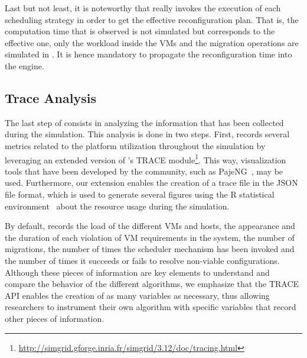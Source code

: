 Last but not least, it is noteworthy that \vmps really invokes the
execution of each scheduling strategy in order to get the effective
reconfiguration plan.  That is, the computation time that is observed
is not simulated but corresponds to the effective one, only the
workload inside the VMs and the migration operations are simulated in
\sg. It is hence mandatory to propagate the reconfiguration time into
the \sg engine.%

\subsection{Trace Analysis}
\label{subsec:traces-analysis}

The last step of \vmps consists in analyzing the information that has
been collected during the simulation.
This analysis is done in two steps. First, \vmps records several
metrics related to the platform utilization throughout the simulation
by leveraging an extended version of \sg's TRACE
module\footnote{\url{http://simgrid.gforge.inria.fr/simgrid/3.12/doc/tracing.html}}.
This way, visualization tools that have been developed by the \sg
community, such as PajeNG~\cite{pageng:www}, may be used. Furthermore,
our extension enables the creation of a trace file in the JSON file
format, which is used to generate several figures using the R
statistical environment~\cite{R:Bloomfield:2014} about the resource
usage during the simulation.

By default, \vmps records the load of the different VMs and hosts, the
appearance and the duration of each violation of VM requirements in
the system, the number of migrations, the number of times the
scheduler mechanism has been invoked and the number of times it
succeeds or fails to resolve non-viable configurations.
%
Although these pieces of information are key elements to understand
and compare the behavior of the different algorithms, we emphasize
that the TRACE API enables the creation of as many variables as
necessary, thus allowing researchers to instrument their own algorithm
with specific variables that record other pieces of information.

